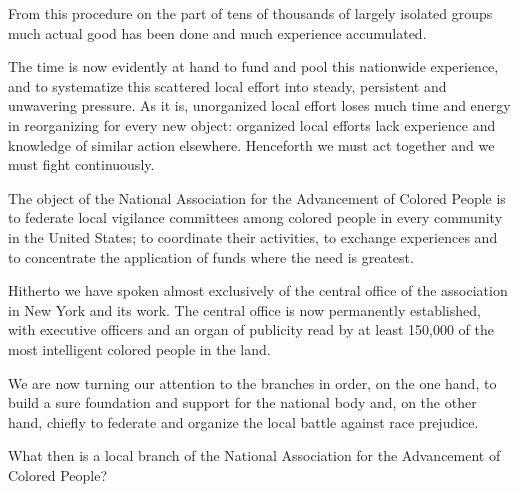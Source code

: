\documentclass[letterpaper,10pt,english]{jupyterBook}
\begin{document}
\sphinxAtStartPar
From this procedure on the part of tens of thousands of largely isolated groups much actual good has been done and much experience accumulated.

\sphinxAtStartPar
The time is now evidently at hand to fund and pool this nation\sphinxhyphen{}wide experience, and to systematize this scattered local effort into steady, persistent and unwavering pressure. As it is, unorganized local effort loses much time and energy in reorganizing for every new object: organized local efforts lack experience and knowledge of similar action elsewhere. Henceforth we must act together and we must fight continuously.

\sphinxAtStartPar
The object of the National Association for the Advancement of Colored People is to federate local vigilance committees among colored people in every community in the United States; to coordinate their activities, to exchange experiences and to concentrate the application of funds where the need is greatest.

\sphinxAtStartPar
Hitherto we have spoken almost exclusively of the central office of the association in New York and its work. The central office is now permanently established, with executive officers and an organ of publicity read by at least 150,000 of the most intelligent colored people in the land.

\sphinxAtStartPar
We are now turning our attention to the branches in order, on the one hand, to build a sure foundation and support for the national body and, on the other hand, chiefly to federate and organize the local battle against race prejudice.

\sphinxAtStartPar
What then is a local branch of the National Association for the Advancement of Colored People?
\end{document}
